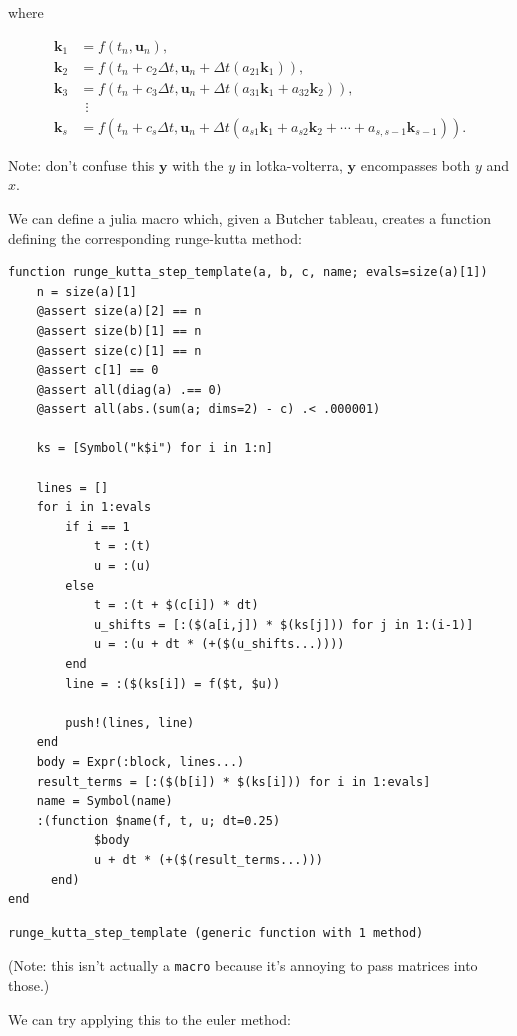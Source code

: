 \documentclass[nobib]{tufte-handout}
\newcommand{\yv}[0]{\mathbf{y}}
\newcommand{\uv}[0]{\mathbf{u}}
\newcommand{\kv}[0]{\mathbf{k}}
\begin{document}
where

\begin{align}
 \kv_1 & = f(t_n, \uv_n), \\
 \kv_2 & = f(t_n+c_2\Delta t, \uv_n+\Delta t(a_{21}\kv_1)), \\
 \kv_3 & = f(t_n+c_3\Delta t, \uv_n+\Delta t(a_{31}\kv_1+a_{32}\kv_2)), \\
     & \ \ \vdots \\
 \kv_s & = f(t_n+c_s\Delta t, \uv_n+\Delta t(a_{s1}\kv_1+a_{s2}\kv_2+\cdots+a_{s,s-1}\kv_{s-1})).
\end{align}

Note: don't confuse this \(\yv\) with the \(y\) in lotka-volterra, \(\yv\) encompasses both \(y\) and \(x\).

We can define a julia macro which, given a Butcher tableau, creates a function defining the corresponding runge-kutta method:

\begin{verbatim}
function runge_kutta_step_template(a, b, c, name; evals=size(a)[1])
    n = size(a)[1]
    @assert size(a)[2] == n
    @assert size(b)[1] == n
    @assert size(c)[1] == n
    @assert c[1] == 0
    @assert all(diag(a) .== 0)
    @assert all(abs.(sum(a; dims=2) - c) .< .000001)

    ks = [Symbol("k$i") for i in 1:n]

    lines = []
    for i in 1:evals
        if i == 1
            t = :(t)
            u = :(u)
        else
            t = :(t + $(c[i]) * dt)
            u_shifts = [:($(a[i,j]) * $(ks[j])) for j in 1:(i-1)]
            u = :(u + dt * (+($(u_shifts...))))
        end
        line = :($(ks[i]) = f($t, $u))

        push!(lines, line)
    end
    body = Expr(:block, lines...)
    result_terms = [:($(b[i]) * $(ks[i])) for i in 1:evals]
    name = Symbol(name)
    :(function $name(f, t, u; dt=0.25)
            $body
            u + dt * (+($(result_terms...)))
      end)
end
\end{verbatim}

\begin{verbatim}
runge_kutta_step_template (generic function with 1 method)
\end{verbatim}


(Note: this isn't actually a \texttt{macro} because it's annoying to pass
matrices into those.)

We can try applying this to the euler method:
\end{document}
